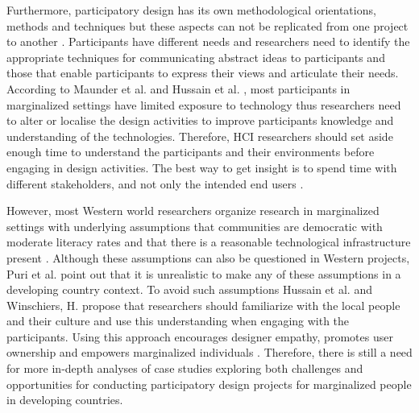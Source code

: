 Furthermore, participatory design  has its own methodological orientations, methods and techniques but these aspects can not be replicated from one project to another \citep{Danaher2013}. Participants have different needs and researchers need to identify the appropriate techniques for communicating abstract ideas to participants and those that enable participants to express their views and articulate their needs. According to Maunder et al. \citep{Maunder2007} and Hussain et al. \citep{Hussain2012}, most participants in marginalized settings have limited exposure to technology thus researchers need to alter or localise the design activities to improve participants knowledge and understanding of the technologies. Therefore, HCI researchers should set aside enough time to understand the participants and their environments before engaging in design activities. The best way to get insight is to spend time with different stakeholders, and not only the intended end users \citep{Hussain2012, Jones2008}.

However, most Western world researchers organize research in marginalized settings with underlying assumptions that communities are democratic with moderate literacy rates and that there is a reasonable technological infrastructure present \citep{Danaher2013,Jones2017}. Although these assumptions can also be questioned in Western projects, Puri et al. \citep{Puri2004} point out that it is unrealistic to make any of these assumptions in a developing country context. To avoid such assumptions Hussain et al. \citep{Hussain2012} and Winschiers, H. \citep{Winschiers2006} propose that researchers should familiarize with the local people and their culture and use this understanding when engaging with the participants. Using this approach encourages designer empathy, promotes user ownership and empowers marginalized individuals \citep{Mattson2014a}. Therefore, there is still a need for more in-depth analyses of case studies exploring both challenges and opportunities for conducting participatory design projects for marginalized people in developing countries.

